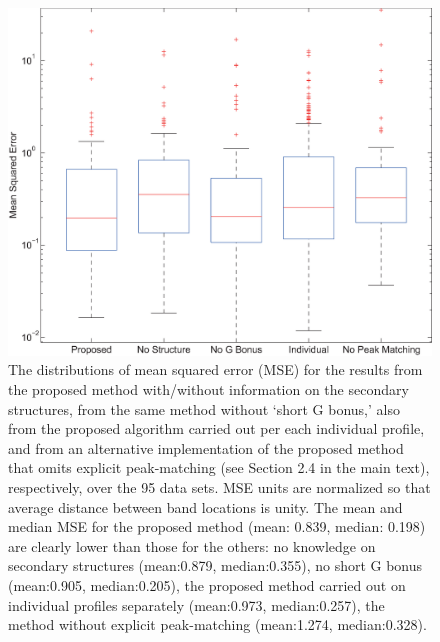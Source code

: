 \documentclass[letter]{bioinfo}
\begin{document}
\begin{figure}
\centering
\includegraphics[width=0.95\linewidth]{figures/FigureS3}
\caption{The distributions of mean squared error (MSE) for the results from the proposed method with/without information on the secondary structures, from the same method without `short G bonus,' also from the proposed algorithm carried out per each individual profile, and from an alternative implementation of the proposed method that omits explicit peak-matching (see Section 2.4 in the main text), respectively, over the 95 data sets. MSE units are normalized so that average distance between band locations is unity. The mean and median MSE for the proposed method (mean: 0.839, median: 0.198) are clearly lower than those for the others: no knowledge on secondary structures (mean:0.879, median:0.355), no short G bonus (mean:0.905, median:0.205), the proposed method carried out on individual profiles separately (mean:0.973, median:0.257), the method without explicit peak-matching (mean:1.274, median:0.328).}
\label{f:old_vs_new}
\end{figure}
\end{document}
